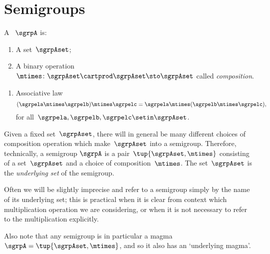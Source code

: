 
\section{Semigroups}
\label{sec:semigroups}


\begin{ctdefinition}[Semigroup]
    \label{def:semigroup}
    A \emph{}~$\sgrpA$ is:
    \begin{body}
        \constit
        \begin{enumerate}
            \item A set~$\sgrpAset$;
            \item A binary operation~$\mtimes  \colon \sgrpAset \cartprod \sgrpAset \sto \sgrpAset$ called \emph{composition}.
        \end{enumerate}
        \condit
        \begin{enumerate}
            \item Associative law
                  \begin{equation}
                      \label{eq:semigroup-associative}
                      (\sgrpela \mtimes   \sgrpelb)\mtimes   \sgrpelc
                      = \sgrpela \mtimes   (\sgrpelb \mtimes  \sgrpelc),
                  \end{equation}
                  for all~$\sgrpela , \sgrpelb, \sgrpelc \setin \sgrpAset$.
        \end{enumerate}
    \end{body}
\end{ctdefinition}

\begin{remark}
    Given a fixed set~$\sgrpAset$, there will in general be many different choices of composition operation which make~$\sgrpAset$ into a semigroup.
    Therefore, technically, a semigroup $\sgrpA$ is a pair~$\tup{\sgrpAset, \mtimes}$ consisting of a set~$\sgrpAset$ and a choice of composition~$\mtimes$.
    The set~$\sgrpAset$ is the \emph{underlying set} of the semigroup.

    Often we will be slightly imprecise and refer to a semigroup simply by the name of its underlying set;
    this is practical when it is clear from context which multiplication operation we are considering, or when it is not necessary to refer to the multiplication explicitly.

    Also note that any semigroup is in particular a magma~$\sgrpA = \tup{\sgrpAset, \mtimes}$, and so it also has an `underlying magma'.
\end{remark}

